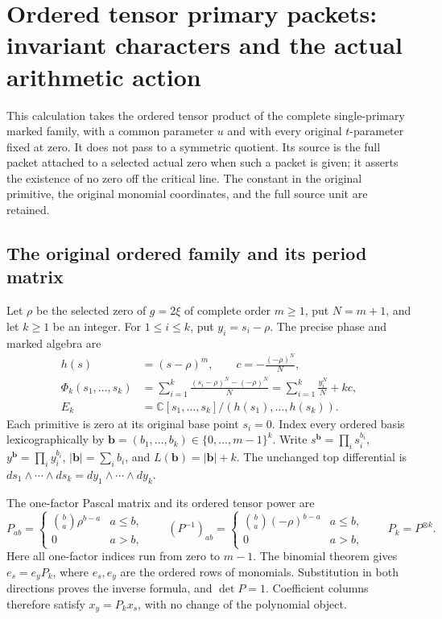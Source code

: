 \section{Ordered tensor primary packets: invariant characters and the actual arithmetic action}
\label{sec:tp-tensor}

This calculation takes the ordered tensor product of the complete
single-primary marked family, with a common parameter \(u\) and with
every original \(t\)-parameter fixed at zero. It does not pass to a
symmetric quotient. Its source is the full packet attached to a selected
actual zero when such a packet is given; it asserts the existence of no
zero off the critical line. The constant in the original primitive,
the original monomial coordinates, and the full source unit are retained.

\subsection{The original ordered family and its period matrix}

Let \(\rho\) be the selected zero of \(g=2\xi\) of complete order
\(m\geq1\), put \(N=m+1\), and let \(k\geq1\) be an integer.
For \(1\leq i\leq k\), put \(y_i=s_i-\rho\). The precise phase and
marked algebra are
\[
 \begin{split}
 h(s)&=(s-\rho)^m,\qquad c=-\frac{(-\rho)^N}{N},\\
 \Phi_k(s_1,\ldots,s_k)
  &=\sum_{i=1}^k\frac{(s_i-\rho)^N-(-\rho)^N}{N}
    =\sum_{i=1}^k\frac{y_i^N}{N}+kc,\\
 E_k&=\mathbb C[s_1,\ldots,s_k]/(h(s_1),\ldots,h(s_k)).
 \end{split}
 \tag{TP.1}\label{eq:tp-family}
\]
Each primitive is zero at its original base point \(s_i=0\).
Index every ordered basis lexicographically by
\(\mathbf b=(b_1,\ldots,b_k)\in\{0,\ldots,m-1\}^k\).
Write \(s^{\mathbf b}=\prod_i s_i^{b_i}\),
\(y^{\mathbf b}=\prod_i y_i^{b_i}\),
\(|\mathbf b|=\sum_i b_i\), and
\(L(\mathbf b)=|\mathbf b|+k\).
The unchanged top differential is
\(ds_1\wedge\cdots\wedge ds_k=dy_1\wedge\cdots\wedge dy_k\).

The one-factor Pascal matrix and its ordered tensor power are
\[
 P_{ab}=\begin{cases}\binom ba\rho^{b-a}&a\leq b,\\0&a>b,
             \end{cases}\qquad
 (P^{-1})_{ab}=\begin{cases}\binom ba(-\rho)^{b-a}&a\leq b,\\0&a>b,
             \end{cases}\qquad
 P_k=P^{\otimes k}.
 \tag{TP.2}\label{eq:tp-pascal}
\]
Here all one-factor indices run from zero to \(m-1\).
The binomial theorem gives \(e_s=e_yP_k\), where \(e_s,e_y\) are
the ordered rows of monomials. Substitution in both directions proves
the inverse formula, and \(\det P=1\). Coefficient columns therefore
satisfy \(x_y=P_kx_s\), with no change of the polynomial object.


